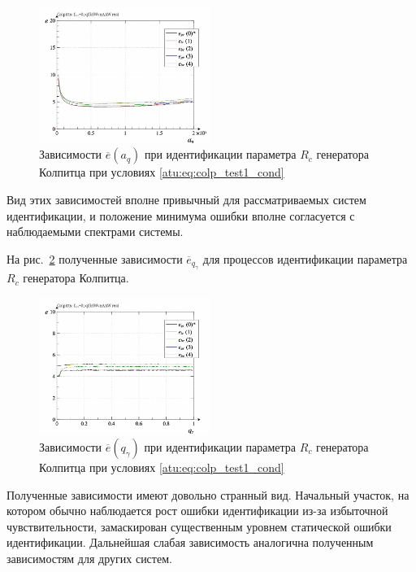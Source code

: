 \begin{figure}[htb!]
  \centerline{\includegraphics[width=0.50\textwidth]{p/r/colp_real_id-p_a_q_d_0.png} }
  \caption{Зависимости $\overline{e}(a_q)$ при идентификации параметра $R_c$ генератора Колпитца при условиях \ref{atu:eq:colp_test1_cond} }
  \label{atu:f:colp_real_id_p_a_q_d_0}
\end{figure}

Вид этих зависимостей вполне привычный для рассматриваемых систем идентификации,
и положение минимума ошибки вполне согласуется с наблюдаемыми спектрами системы.

На рис.~\ref{atu:f:colp_real_id_p_q_gamma_d_0} полученные зависимости
$\overline{e}_{q_\gamma}$
для процессов идентификации параметра $R_c$ генератора Колпитца.

\begin{figure}[htb!]
  \centerline{\includegraphics[width=0.50\textwidth]{p/r/colp_real_id-p_q_gamma_d_0.png} }
  \caption{Зависимости $\overline{e}(q_\gamma)$ при идентификации параметра $R_c$ генератора Колпитца при условиях \ref{atu:eq:colp_test1_cond} }
  \label{atu:f:colp_real_id_p_q_gamma_d_0}
\end{figure}

Полученные зависимости имеют довольно странный вид.
Начальный участок, на котором обычно наблюдается рост ошибки
идентификации из-за избыточной чувствительности,
замаскирован существенным уровнем статической ошибки идентификации.
Дальнейшая слабая зависимость аналогична полученным зависимостям для других систем.

